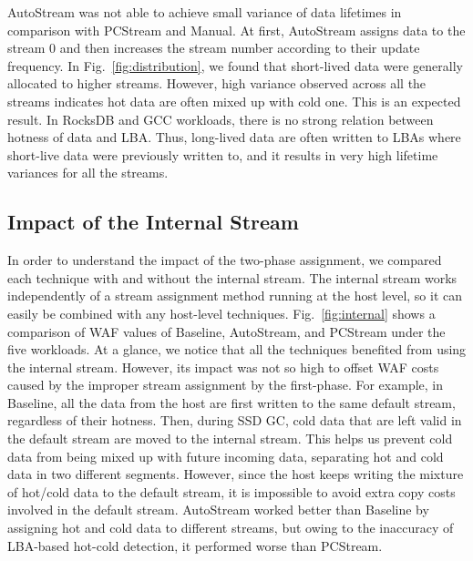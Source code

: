 AutoStream was not able to achieve small variance of data lifetimes in
comparison with PCStream and Manual. At first, AutoStream assigns data to the
stream 0 and then increases the stream number according to their update
frequency. In Fig.~\ref{fig:distribution}, we found that short-lived data were
generally allocated to higher streams.  However, high variance observed across
all the streams indicates hot data are often mixed up with cold one.  This is
an expected result. In RocksDB and GCC workloads, there is no strong relation
between hotness of data and LBA.  Thus, long-lived data are often written to
LBAs where short-live data were previously written to, and it results in very
high lifetime variances for all the streams.

\subsection{Impact of the Internal Stream}

In order to understand the impact of the two-phase assignment, we compared each
technique with and without the internal stream.  The internal stream works
independently of a stream assignment method running at the host level, so it
can easily be combined with any host-level techniques.  Fig.~\ref{fig:internal}
shows a comparison of WAF values of Baseline, AutoStream, and PCStream under
the five workloads.  At a glance, we notice that all the techniques benefited
from using the internal stream.  However, its impact was not so high to offset
WAF costs caused by the improper stream assignment by the first-phase.  For
example, in Baseline, all the data from the host are first written to the same
default stream, regardless of their hotness.  Then, during SSD GC, cold data
that are left valid in the default stream are moved to the internal stream.
This helps us prevent cold data from being mixed up with future incoming data,
separating hot and cold data in two different segments. However, since the host
keeps writing the mixture of hot/cold data to the default stream, it is
impossible to avoid extra copy costs involved in the default stream.
AutoStream worked better than Baseline by assigning hot and cold data to
different streams, but owing to the inaccuracy of LBA-based hot-cold detection,
it performed worse than PCStream.

